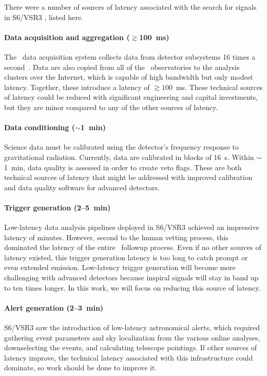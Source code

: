 There were a number of sources of latency associated with the search for
\CBC{} signals in S6/VSR3 \citep{HugheyGWPAW2011}, listed here.

\paragraph{Data acquisition and aggregation ($\gtrsim$100~ms)}%
The \LIGO\ data acquisition system collects data from detector subsystems 16
times a second~\citep{Bork2001}. Data are also copied from all of the \GW\
observatories to the analysis clusters over the Internet, which is capable of
high bandwidth but only modest latency.  Together, these introduce a
latency of $\gtrsim$$100$~ms.  These technical sources of latency could be reduced
with significant engineering and capital investments, but they are minor compared
to any of the other sources of latency.

\paragraph{Data conditioning ($\sim$1~min)}%
Science data must be calibrated using the detector's frequency
response to gravitational radiation.  Currently, data are calibrated in blocks of
16~s.  Within $\sim$1~min, data quality is assessed in order to create veto flags.
These are both technical sources of latency that might be addressed with improved
calibration and data quality software for advanced detectors.

\paragraph{Trigger generation (2--5~min)}%
Low-latency data analysis pipelines
deployed in S6/VSR3 achieved an impressive latency of minutes.  However, second
to the human vetting process, this dominated the latency of the entire \EM\
followup process.  Even if no other sources of latency existed, this trigger
generation latency is too long to catch prompt or even extended emission.
Low-latency trigger generation will become more challenging with advanced detectors
because inspiral signals will stay in band up to ten times longer.  In this work,
we will focus on reducing this source of latency.

\paragraph{Alert generation (2--3~min)}%
S6/VSR3 saw the introduction of low-latency astronomical
alerts, which required gathering event parameters and sky localization from the
various online analyses, downselecting the events, and calculating telescope pointings.
If other sources of latency improve, the technical latency associated with this
infrastructure could dominate, so work should be done to improve it.

